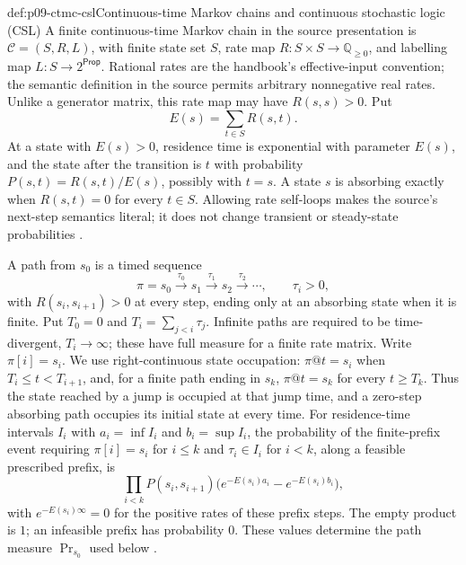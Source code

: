 \begin{hbdefinition}{def:p09-ctmc-csl}{Continuous-time Markov chains and continuous stochastic logic (CSL)}
A finite continuous-time Markov chain in the source presentation is
\(\mathcal C=(S,R,L)\), with finite state set \(S\), rate map
\(R:S\times S\to\mathbb Q_{\geq0}\), and labelling map
\(L:S\to2^{\mathsf{Prop}}\).  Rational rates are the handbook's effective-input
convention; the semantic definition in the source permits arbitrary
nonnegative real rates.  Unlike a generator matrix, this rate map may have
\(R(s,s)>0\).  Put
\[
 E(s)=\sum_{t\in S}R(s,t).
\]
At a state with \(E(s)>0\), residence time is exponential with parameter
\(E(s)\), and the state after the transition is \(t\) with probability
\(P(s,t)=R(s,t)/E(s)\), possibly with \(t=s\).  A state \(s\) is absorbing
exactly when \(R(s,t)=0\) for every \(t\in S\).  Allowing rate self-loops makes
the source's next-step semantics literal; it does not change transient or
steady-state probabilities \cite[Def.~1 and \S2.1]{BaierHaverkortHermannsKatoen2003}.

A path from \(s_0\) is a timed sequence
\[
 \pi=s_0\xrightarrow{\tau_0}s_1
       \xrightarrow{\tau_1}s_2\xrightarrow{\tau_2}\cdots,
 \qquad \tau_i>0,
\]
with \(R(s_i,s_{i+1})>0\) at every step, ending only at an absorbing state
when it is finite.  Put \(T_0=0\) and
\(T_i=\sum_{j<i}\tau_j\).  Infinite paths are required to be time-divergent,
\(T_i\to\infty\); these have full measure for a finite rate matrix.
Write \(\pi[i]=s_i\).  We use right-continuous state occupation:
\(\pi@t=s_i\) when \(T_i\leq t<T_{i+1}\), and, for a finite path ending
in \(s_k\), \(\pi@t=s_k\) for every \(t\geq T_k\).
Thus the state reached by a jump is occupied at that jump time, and a
zero-step absorbing path occupies its initial state at every time.
For residence-time intervals \(I_i\) with
\(a_i=\inf I_i\) and \(b_i=\sup I_i\), the probability of the finite-prefix
event requiring \(\pi[i]=s_i\) for \(i\leq k\) and
\(\tau_i\in I_i\) for \(i<k\), along a feasible prescribed prefix, is
\[
 \prod_{i<k}P(s_i,s_{i+1})
   \bigl(e^{-E(s_i)a_i}-e^{-E(s_i)b_i}\bigr),
\]
with \(e^{-E(s_i)\infty}=0\) for the positive rates of these prefix steps.
The empty product is \(1\); an infeasible prefix has probability \(0\).
These values determine the path measure
\(\Pr_{s_0}\) used below \cite[\S\S2.2--2.3]{BaierHaverkortHermannsKatoen2003}.


\end{hbdefinition}
